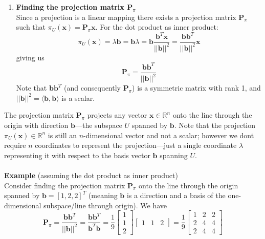 \documentclass{report}
\begin{document}
\begin{enumerate}
(next page)
\newpage
\item\textbf{Finding the projection matrix $\bm{P}_\pi$}\\
Since a projection is a linear mapping there exists a projection matrix $\bm{P}_\pi$ such that
$\pi_U(\bm{x})=\bm{P}_\pi\bm{x}$. For the dot product as inner product:
\begin{equation*}
\pi_U(\bm{x})=\lambda\bm{b}=\bm{b}\lambda=\bm{b}\frac{\bm{b}^T\bm{x}}{||\bm{b}||^2}=
\frac{\bm{b}\bm{b}^T}{||\bm{b}||^2}\bm{x}
\end{equation*}
giving us
\begin{equation*}
\bm{P}_\pi=\frac{\bm{b}\bm{b}^T}{||\bm{b}||^2}
\end{equation*}
Note that $\bm{bb}^T$ (and consequently $\bm{P}_\pi$) is a symmetric matrix with rank 1, 
and $||\bm{b}||^2=\langle\bm{b},\bm{b}\rangle$ is a scalar.
\end{enumerate}
The projection matrix $\bm{P}_\pi$ projects any vector $\bm{x}\in\mathbb{R}^n$ onto the line through the origin
with direction $\bm{b}$---the subspace $U$ spanned by $\bm{b}$. Note that the projection 
$\pi_U(\bm{x})\in\mathbb{R}^n$ is still an $n$-dimensional vector and not a scalar; however we dont require 
$n$ coordinates to represent the projection---just a single coordinate $\lambda$ representing it 
with respect to the basis vector $\bm{b}$ spanning $U$.\\
\vspace{1mm}\\
\textbf{Example} (assuming the dot product as inner product)\\
Consider finding the projection matrix $\bm{P}_\pi$ onto the line through the origin spanned by 
$\bm{b}=[1,2,2]^T$ (meaning $\bm{b}$ is a direction and a basis of the one-dimensional 
subspace/line through origin). We have
\begin{equation*}
\bm{P}_\pi=\frac{\bm{b}\bm{b}^T}{||\bm{b}||^2}
=\frac{\bm{b}\bm{b}^T}{\bm{b}^T\bm{b}}
=\frac{1}{9}\begin{bmatrix}1\\1\\2\end{bmatrix}
\begin{bmatrix}1&1&2\end{bmatrix}
=\frac{1}{9}\begin{bmatrix}
1&2&2\\2&4&4\\2&4&4\end{bmatrix}
\end{equation*}
\end{document}
